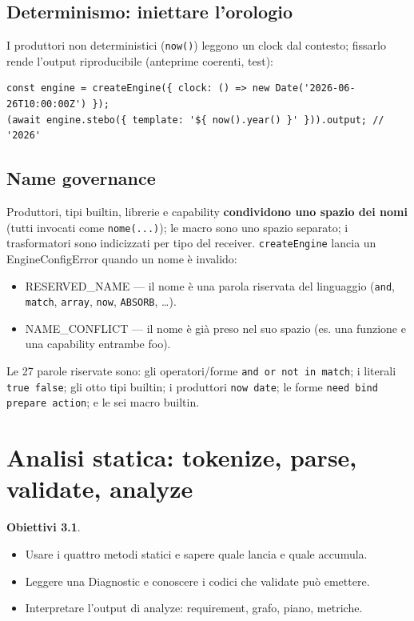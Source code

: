 \documentclass[11pt,a4paper]{book}
\let\code\lstinline
\newcommand{\ic}[1]{{\ttfamily #1}}
\theoremstyle{definition}
\newtheorem*{obiettivi}{Obiettivi}
\begin{document}
{{{{\section{Determinismo: iniettare l'orologio}

I produttori non deterministici (\code|now()|) leggono un \ic{clock} dal contesto;
fissarlo rende l'output riproducibile (anteprime coerenti, test):

\begin{lstlisting}
const engine = createEngine({ clock: () => new Date('2026-06-26T10:00:00Z') });
(await engine.stebo({ template: '${ now().year() }' })).output; // '2026'
\end{lstlisting}

\section{Name governance}
\label{sec:governance}

Produttori, tipi builtin, librerie e capability \textbf{condividono uno spazio dei
nomi} (tutti invocati come \code|nome(...)|); le macro sono uno spazio separato; i
trasformatori sono indicizzati per tipo del receiver. \code|createEngine| lancia un
\ic{EngineConfigError} quando un nome è invalido:

\begin{itemize}
  \item \ic{RESERVED\_NAME} --- il nome è una parola riservata del linguaggio
    (\code|and|, \code|match|, \code|array|, \code|now|, \code|ABSORB|, \ldots).
  \item \ic{NAME\_CONFLICT} --- il nome è già preso nel suo spazio (es. una funzione
    e una capability entrambe \ic{foo}).
\end{itemize}

Le 27 parole riservate sono: gli operatori/forme \code|and or not in match|; i
literali \code|true false|; gli otto tipi builtin; i produttori \code|now date|;
le forme \code|need bind prepare action|; e le sei macro builtin.

\chapter{Analisi statica: tokenize, parse, validate, analyze}
\label{ch:analisi}

\begin{obiettivi}
\begin{itemize}
  \item Usare i quattro metodi statici e sapere quale lancia e quale accumula.
  \item Leggere una \ic{Diagnostic} e conoscere i codici che \ic{validate} può
    emettere.
  \item Interpretare l'output di \ic{analyze}: requirement, grafo, piano, metriche.
\end{itemize}
\end{obiettivi}

}}}}
\end{document}
